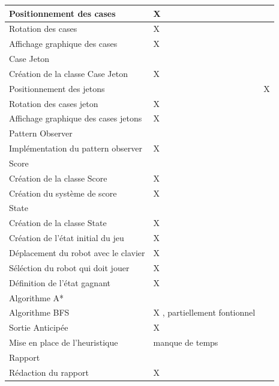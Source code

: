 \documentclass[a4paper, 12pt]{article}
\begin{document}
\begin{center}
\begin{tabular}{|p{7cm}|>{\centering\arraybackslash}p{4cm}|>{\centering\arraybackslash}p{4cm}|}
                 \hline
                 Positionnement des cases & X & \\
                  \hline
                Rotation des cases & X & \\
                \hline
                 Affichage graphique des cases & X & \\
            \hline %
                \rowcolor{ashgrey} Case Jeton   & &\\
                Création de la classe Case Jeton & X & \\
                \hline
                Positionnement des jetons & & X\\
                \hline
                Rotation des cases jeton & X & \\
                 \hline
                Affichage graphique des cases jetons & X & \\
            \hline %
                \rowcolor{ashgrey} Pattern Observer  & &\\
                Implémentation du pattern observer & X & \\   
             \hline %
                \rowcolor{ashgrey} Score  & &\\
                 Création de la classe Score & X & \\
                 \hline
                Création du système de score & X & \\   
            \hline %
                \rowcolor{ashgrey} State & &\\
                 Création de la classe State & X & \\
                 \hline
                Création de l'état initial du jeu & X & \\   
                \hline
                Déplacement du robot avec le clavier & X &\\
                \hline
                Séléction du robot qui doit jouer & X &\\
                \hline
                Définition de l'état gagnant & X &\\
            \hline %
             \rowcolor{ashgrey} Algorithme A* & &\\
                Algorithme BFS & X , partiellement fontionnel & \\   
                \hline
                 Sortie Anticipée & X &\\  
                \hline
                 Mise en place de l'heuristique & manque de temps &\\  
                \hline
             \hline %
             \rowcolor{ashgrey} Rapport & &\\
             Rédaction du rapport & X & \\
            \hline %
        \end{tabular}
    \end{center}
    
\end{document}
